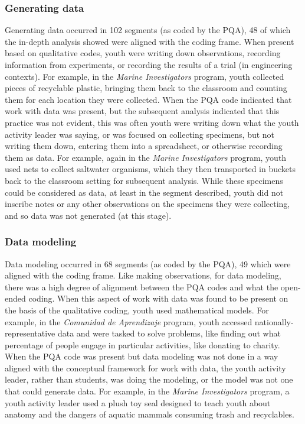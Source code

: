 \documentclass[]{msu-thesis}
\theoremstyle{definition}
\theoremstyle{definition}
\theoremstyle{definition}
\theoremstyle{remark}
\begin{document}
\subsubsection{Generating data}\label{generating-data}

Generating data occurred in 102 segments (as coded by the PQA), 48 of
which the in-depth analysis showed were aligned with the coding frame.
When present based on qualitative codes, youth were writing down
observations, recording information from experiments, or recording the
results of a trial (in engineering contexts). For example, in the
\emph{Marine Investigators} program, youth collected pieces of
recyclable plastic, bringing them back to the classroom and counting
them for each location they were collected. When the PQA code indicated
that work with data was present, but the subsequent analysis indicated
that this practice was not evident, this was often youth were writing
down what the youth activity leader was saying, or was focused on
collecting specimens, but not writing them down, entering them into a
spreadsheet, or otherwise recording them as data. For example, again in
the \emph{Marine Investigators} program, youth used nets to collect
saltwater organisms, which they then transported in buckets back to the
classroom setting for subsequent analysis. While these specimens could
be considered as data, at least in the segment described, youth did not
inscribe notes or any other observations on the specimens they were
collecting, and so data was not generated (at this stage).

\subsubsection{Data modeling}\label{data-modeling}

Data modeling occurred in 68 segments (as coded by the PQA), 49 which
were aligned with the coding frame. Like making observations, for data
modeling, there was a high degree of alignment between the PQA codes and
what the open-ended coding. When this aspect of work with data was found
to be present on the basis of the qualitative coding, youth used
mathematical models. For example, in the \emph{Comunidad de Aprendizaje}
program, youth accessed nationally-representative data and were tasked
to solve problems, like finding out what percentage of people engage in
particular activities, like donating to charity. When the PQA code was
present but data modeling was not done in a way aligned with the
conceptual framework for work with data, the youth activity leader,
rather than students, was doing the modeling, or the model was not one
that could generate data. For example, in the \emph{Marine
Investigators} program, a youth activity leader used a plush toy seal
designed to teach youth about anatomy and the dangers of aquatic mammals
consuming trash and recyclables.
\end{document}
